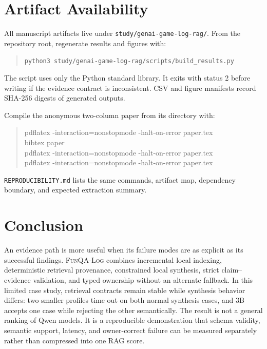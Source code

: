 \documentclass[10pt,twocolumn]{article}
\newcommand{\system}{\textsc{FunQA-Log}}
\DeclareRobustCommand{\rawpath}[1]{\nolinkurl{#1}}
\begin{document}
\section{Artifact Availability}
All manuscript artifacts live under \rawpath{study/genai-game-log-rag/}.  From the repository root, regenerate results and figures with:
\begin{quote}\small
\rawpath{python3 study/genai-game-log-rag/scripts/build_results.py}
\end{quote}
The script uses only the Python standard library.  It exits with status 2 before writing if the evidence contract is inconsistent.  CSV and figure manifests record SHA-256 digests of generated outputs.

Compile the anonymous two-column paper from its directory with:
\begin{quote}\small\ttfamily
pdflatex -interaction=nonstopmode -halt-on-error paper.tex\\
bibtex paper\\
pdflatex -interaction=nonstopmode -halt-on-error paper.tex\\
pdflatex -interaction=nonstopmode -halt-on-error paper.tex
\end{quote}
\rawpath{REPRODUCIBILITY.md} lists the same commands, artifact map, dependency boundary, and expected extraction summary.

\section{Conclusion}
An evidence path is more useful when its failure modes are as explicit as its successful findings.  \system{} combines incremental local indexing, deterministic retrieval provenance, constrained local synthesis, strict claim--evidence validation, and typed ownership without an alternate fallback.  In this limited case study, retrieval contracts remain stable while synthesis behavior differs: two smaller profiles time out on both normal synthesis cases, and 3B accepts one case while rejecting the other semantically.  The result is not a general ranking of Qwen models.  It is a reproducible demonstration that schema validity, semantic support, latency, and owner-correct failure can be measured separately rather than compressed into one RAG score.

\appendix
\end{document}

